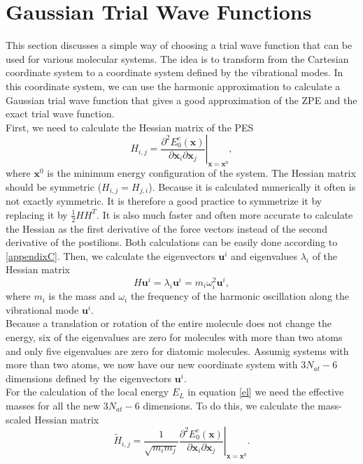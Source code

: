 \documentclass [12pt]{report}
\begin{document}
\section{Gaussian Trial Wave Functions}
This section discusses a simple way of choosing a trial wave function that can be used for various molecular systems. The idea is to transform from the Cartesian coordinate system to a coordinate system defined by the vibrational modes. In this coordinate system, we can use the harmonic approximation to calculate a Gaussian trial wave function that gives a good approximation of the ZPE and the exact trial wave function.\\
First, we need to calculate the Hessian matrix of the PES
\begin{equation}
H_{i,j} = \left. \frac{\partial^2 E_0^e(\bm{x})}{\partial \bm{x}_i \partial \bm{x}_j }\right|_{\bm{x} = \bm{x}^0},
\end{equation}
where $\bm{x}^0$ is the minimum energy configuration of the system. The Hessian matrix should be symmetric ($H_{i,j} = H_{j,i}$). Because it is calculated numerically it often is not exactly symmetric. It is therefore a good practice to symmetrize it by replacing it by $\frac{1}{2} H H^T$. It is also much faster and often more accurate to calculate the Hessian as the first derivative of the force vectors instead of the second derivative of the postilions. Both calculations can be easily done according to \ref{appendixC}.
Then, we calculate the eigenvectors $\bm{u}^i$ and  eigenvalues $\lambda_i$ of the Hessian matrix
\begin{equation} \label{eigs}
H \bm{u}^i = \lambda_i \bm{u}^i = m_i \omega_i^2 \bm{u}^i,
\end{equation}
where $m_i$ is the mass and $\omega_i$ the frequency of the harmonic oscillation along the vibrational mode $\bm{u}^i$.\\
Because a translation or rotation of the entire molecule does not change the energy, six of the eigenvalues are zero for molecules with more than two atoms and only five eigenvalues are zero for diatomic molecules. Assumig systems with more than two atoms, we now have our new coordinate system with $3 N_{at} - 6$ dimensions defined by the eigenvectors $\bm{u}^i$.\\
For the calculation of the local energy $E_L$ in equation \eqref{el} we need the effective masses for all the new $3 N_{at} - 6$ dimensions. To do this, we calculate the mass-scaled Hessian matrix
\begin{equation}
\tilde{H}_{i,j} = \left. \frac{1}{\sqrt{m_i m_j}}\frac{\partial^2 E_0^e(\bm{x})}{ \partial \bm{x}_i \partial \bm{x}_j }\right|_{\bm{x} = \bm{x}^0}.
\end{equation}
\end{document}
